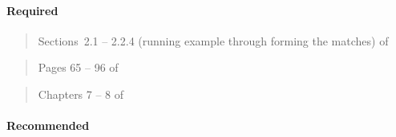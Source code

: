 \documentclass[12pt]{article}
\begin{document}
\begin{verse}  \end{verse}

\paragraph*{Required}

\begin{verse} Sections~2.1 -- 2.2.4 (running example through forming the matches) of  \end{verse}

\begin{verse} Pages 65 -- 96 of  \end{verse}

\begin{verse} Chapters 7 -- 8 of  \end{verse}

\begin{verse}  \end{verse}

\paragraph*{Recommended}

\begin{verse}  \end{verse}

\begin{verse}  \end{verse}

\begin{verse}  \end{verse}

\begin{verse}  \end{verse}

\begin{verse}  \end{verse}

\begin{verse}  \end{verse}

\begin{verse}  \end{verse}
\end{document}
